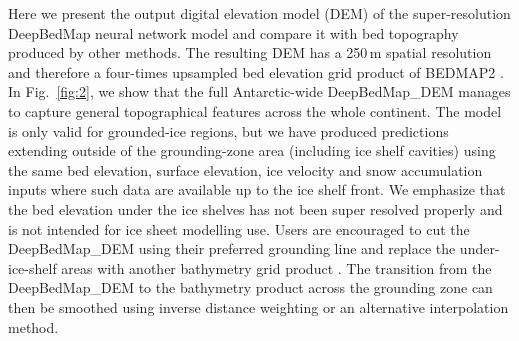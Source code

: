 \documentclass[tc, noline]{copernicus}
\begin{document}
Here we present the output digital elevation model (DEM) of the super-resolution DeepBedMap neural network model and compare it with bed topography produced by other methods.
The resulting DEM has a 250\,\unit{m} spatial resolution and therefore a four-times upsampled bed elevation grid product of BEDMAP2 \citep{FretwellBedmap2improvedice2013}.
In Fig.~\ref{fig:2}, we show that the full Antarctic-wide DeepBedMap\_DEM manages to capture general topographical features across the whole continent.
The model is only valid for grounded-ice regions, but we have produced predictions extending outside of the grounding-zone area (including ice shelf cavities) using the same bed elevation, surface elevation, ice velocity and snow accumulation inputs where such data are available up to the ice shelf front.
We emphasize that the bed elevation under the ice shelves has not been super resolved properly and is not intended for ice sheet modelling use.
Users are encouraged to cut the DeepBedMap\_DEM using their preferred grounding line \citep[e.g.][]{BindschadlerGettingAntarcticanew2011,RignotAntarcticgroundingline2011,MouginotMEaSURESAntarcticBoundaries2017} and replace the under-ice-shelf areas with another bathymetry grid product \citep[e.g.][]{GEBCOCompilationGroupGEBCO2020Grid2020}.
The transition from the DeepBedMap\_DEM to the bathymetry product across the grounding zone can then be smoothed using inverse distance weighting or an alternative interpolation method.
\end{document}
